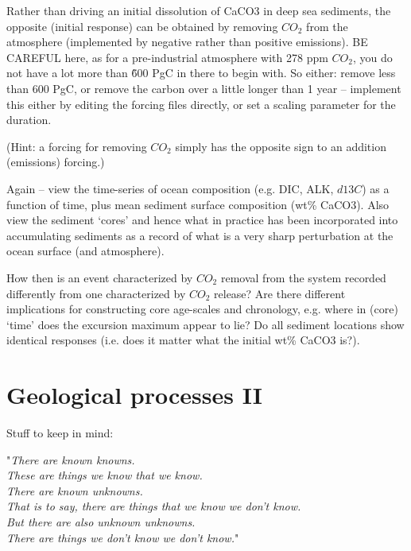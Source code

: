 \documentclass[11pt,fleqn]{book} %
\begin{document}
Rather than driving an initial dissolution of CaCO3 in deep sea sediments, the opposite (initial response) can be obtained by removing \(CO_{2}\) from the atmosphere (implemented by negative rather than positive emissions). BE CAREFUL here, as for a pre-industrial atmosphere with 278 ppm \(CO_{2}\), you do not have a lot more than \~600 PgC in there to begin with. So either: remove less than 600 PgC, or remove the carbon over a little longer than 1 year – implement this either by editing the forcing files directly, or set a scaling parameter for the duration.

(Hint: a forcing for removing \(CO_{2}\) simply has the opposite sign to an addition (emissions) forcing.)

Again – view the time-series of ocean composition (e.g. DIC, ALK, \(d13C\)) as a function of time, plus mean sediment surface composition (wt\% CaCO3). Also view the sediment ‘cores’ and hence what in practice has been incorporated into accumulating sediments as a record of what is a very sharp perturbation at the ocean surface (and atmosphere).

How then is an event characterized by \(CO_{2}\) removal from the system recorded differently from one characterized by \(CO_{2}\) release? Are there different implications for constructing core age-scales and chronology, e.g. where in (core) ‘time’ does the excursion maximum appear to lie? Do all sediment locations show identical responses (i.e. does it matter what the initial wt\% CaCO3 is?).


\cleardoublepage


\chapter{Geological processes II}

\hfill \break

\vspace{18mm}

\noindent Stuff to keep in mind:
\hfill \break

\noindent "\textit{There are known knowns.\\
These are things we know that we know.\\
There are known unknowns.\\
That is to say, there are things that we know we don't know.\\
But there are also unknown unknowns.\\
There are things we don't know we don't know.}"
\end{document}
